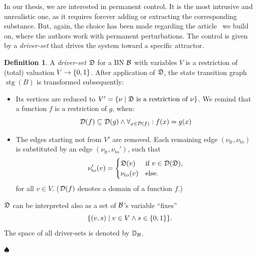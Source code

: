 \documentclass[
	digital, oneside, nosansbold, nocolorbold, nolot, nolof
]{fithesis4}
\theoremstyle{definition}
\newtheorem{definition}{Definition}
\theoremstyle{definition}
\newenvironment{ldefinition}
    {\begin{definition}}
	{\par\hspace{\stretch{1}}$\spadesuit$\hspace{\stretch{1}}
     \par\end{definition}}
\DeclareMathOperator{\stg}{stg}
\DeclarePairedDelimiter{\set}{\{}{\}}
\begin{document}
In our thesis, we are interested in permanent control. It is the most intrusive
and unrealistic one, as it requires forever adding or extracting the
corresponding substance. But, again, the choice has been made regarding the
article~\cite{infl_max_BN} we build on, where the authors work with permanent
perturbations. The control is given by a \emph{driver-set} that drives the
system toward a specific attractor.

\begin{ldefinition}
A \emph{driver-set} $\mathfrak{D}$ for a BN $\mathcal{B}$ with variables $V$ is a
restriction of (total) valuation $V \to \set{0, 1}$. After application of
$\mathfrak{D}$, the state transition graph $\stg(B)$ is transformed subsequently:
\begin{itemize}
    \item Its vertices are reduced to $V' = \set{\nu \mid \dset{D} \text{ is
        a restriction of } \nu}$. We remind that a function $f$ is a
        restriction of $g$, when:
        \[
        \mathcal{D}(f) \subseteq \mathcal{D}(g) \land \forall_{x \in \mathcal{D}(f)} : f(x) = g(x)
        \]
    \item The edges starting not from $V'$ are removed.
        Each remaining edge $(\nu_{\text{fr}}, \nu_{\text{to}})$ is
        substituted by an edge $(\nu_{\text{fr}}, \nu_{\text{to}}')$,
        such that
        \[
            \nu_{\text{to}}'(v) =
            \begin{cases}
                \mathfrak{D}(v) & \text{if } v \in \mathcal{D}(\mathfrak{D}),\\
                \nu_{\text{to}}(v) & \text{else}.
            \end{cases}
        \]
        for all $v \in V$. ($\mathcal{D}(f)$ denotes a domain of a function $f$.)
\end{itemize}

$\mathfrak{D}$ can be interpreted also as a set of $\mathcal{B}$'s variable
\enquote{fixes}
\[
    \set*{(v, s) \mid v \in V \land s \in \set{0, 1}}.
\]
The space of all driver-sets is denoted by $\mathbb{D}_{\mathcal{B}}$.
\end{ldefinition}
\end{document}
